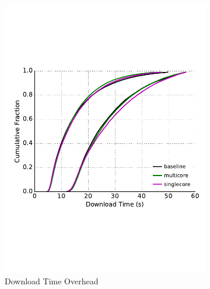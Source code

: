 
\begin{figure} \centering
	\begin{subfigure}[t]{0.32\textwidth} \centering
\includegraphics[trim={0 3cm 0 3cm}, clip, width=1.0\textwidth]{images/overhead_downloadtime.pdf}
		\caption{Download Time Overhead}
		\label{fig:overhead_ttlastbyte}
	\end{subfigure}
	\begin{subfigure}[t]{0.32\textwidth} \centering

\end{subfigure}
\end{figure}
